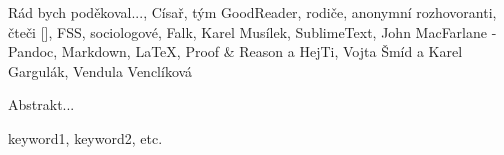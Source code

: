 \documentclass[12pt,oneside,final]{fithesis2}
\begin{document}
\FrontMatter
\ThesisTitlePage

\begin{ThesisDeclaration}
\DeclarationText
\AdvisorName
\end{ThesisDeclaration}

\begin{ThesisThanks}
Rád bych poděkoval..., Císař, tým GoodReader, rodiče, anonymní rozhovoranti, čteči [], FSS, sociologové, Falk, Karel Musílek, SublimeText, John MacFarlane - Pandoc, Markdown, LaTeX, Proof \& Reason a HejTi, Vojta Šmíd a Karel Gargulák, Vendula Venclíková
\end{ThesisThanks}

\begin{ThesisAbstract}
Abstrakt...
\end{ThesisAbstract}

\begin{ThesisKeyWords}
keyword1, keyword2, etc.
\end{ThesisKeyWords}

\MainMatter

\tableofcontents          %





\end{document}
